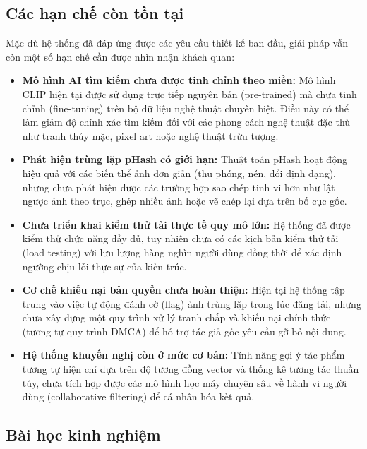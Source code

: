\subsection{Các hạn chế còn tồn tại}

Mặc dù hệ thống đã đáp ứng được các yêu cầu thiết kế ban đầu, giải pháp vẫn còn một số hạn chế cần được nhìn nhận khách quan:

\begin{itemize}
    \item \textbf{Mô hình AI tìm kiếm chưa được tinh chỉnh theo miền:} Mô hình CLIP hiện tại được sử dụng trực tiếp nguyên bản (pre-trained) mà chưa tinh chỉnh (fine-tuning) trên bộ dữ liệu nghệ thuật chuyên biệt. Điều này có thể làm giảm độ chính xác tìm kiếm đối với các phong cách nghệ thuật đặc thù như tranh thủy mặc, pixel art hoặc nghệ thuật trừu tượng.

    \item \textbf{Phát hiện trùng lặp pHash có giới hạn:} Thuật toán pHash hoạt động hiệu quả với các biến thể ảnh đơn giản (thu phóng, nén, đổi định dạng), nhưng chưa phát hiện được các trường hợp sao chép tinh vi hơn như lật ngược ảnh theo trục, ghép nhiều ảnh hoặc vẽ chép lại dựa trên bố cục gốc.

    \item \textbf{Chưa triển khai kiểm thử tải thực tế quy mô lớn:} Hệ thống đã được kiểm thử chức năng đầy đủ, tuy nhiên chưa có các kịch bản kiểm thử tải (load testing) với lưu lượng hàng nghìn người dùng đồng thời để xác định ngưỡng chịu lỗi thực sự của kiến trúc.

    \item \textbf{Cơ chế khiếu nại bản quyền chưa hoàn thiện:} Hiện tại hệ thống tập trung vào việc tự động đánh cờ (flag) ảnh trùng lặp trong lúc đăng tải, nhưng chưa xây dựng một quy trình xử lý tranh chấp và khiếu nại chính thức (tương tự quy trình DMCA) để hỗ trợ tác giả gốc yêu cầu gỡ bỏ nội dung.

    \item \textbf{Hệ thống khuyến nghị còn ở mức cơ bản:} Tính năng gợi ý tác phẩm tương tự hiện chỉ dựa trên độ tương đồng vector và thống kê tương tác thuần túy, chưa tích hợp được các mô hình học máy chuyên sâu về hành vi người dùng (collaborative filtering) để cá nhân hóa kết quả.
\end{itemize}

\subsection{Bài học kinh nghiệm}

